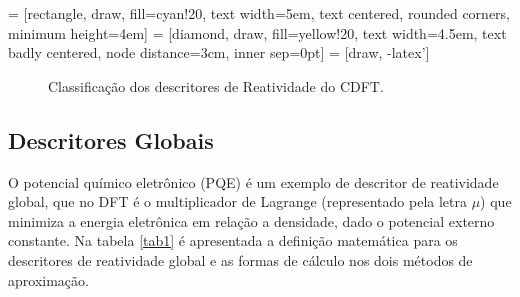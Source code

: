 \documentclass[a4paper,11pt]{refart}
\begin{document}
 = [rectangle, draw, fill=cyan!20, 
text width=5em, text centered, rounded corners, minimum height=4em]
 = [diamond, draw, fill=yellow!20, 
text width=4.5em, text badly centered, node distance=3cm, inner sep=0pt]
 = [draw, -latex']

\begin{figure}[H]
	\centering
{}
\caption{Classificação dos descritores de Reatividade do CDFT.} \label{fig:M1}
\end{figure}


\subsection{Descritores Globais}

O potencial químico eletrônico (PQE) é um exemplo de descritor de reatividade global, que no DFT é o multiplicador de Lagrange (representado pela letra $\mu$) que minimiza a energia eletrônica em relação a densidade, dado o potencial externo constante. Na tabela \autoref{tab1} é apresentada a definição matemática para os descritores de reatividade global e as formas de cálculo nos dois métodos de aproximação.  
\end{document}
